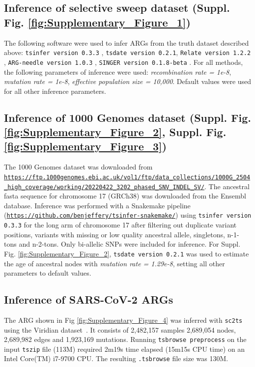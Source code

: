 \documentclass[unnumsec,webpdf,contemporary,large,namedate]{oup-authoring-template}%
\begin{document}
\subsection{Inference of selective sweep dataset (Suppl. Fig.
    \ref{fig:Supplementary_Figure_1})} The following software were used to infer
ARGs from the truth dataset described above: \texttt{tsinfer version 0.3.3}
\citep{kelleher2019inferring}, \texttt{tsdate version 0.2.1}, 
\texttt{Relate version 1.2.2} \citep{speidel2019method}, 
\texttt{ARG-needle version 1.0.3} \citep{zhang2023biobank},
\texttt{SINGER version 0.1.8-beta} \citep{deng2024robust}.
For all
methods, the following parameters of inference were used: \textit{recombination
    rate = 1e-8}, \textit{mutation rate = 1e-8}, \textit{effective population size
    = 10,000}. Default values were used for all other inference parameters.

\subsection{Inference of 1000 Genomes dataset (Suppl. Fig.
\ref{fig:Supplementary_Figure_2}, Suppl. Fig.
\ref{fig:Supplementary_Figure_3})} The 1000 Genomes dataset was downloaded from
\texttt{\url{https://ftp.1000genomes.ebi.ac.uk/vol1/ftp/data_collections/1000G_2504_high_coverage/working/20220422_3202_phased_SNV_INDEL_SV/}}.
The ancestral fasta sequence for chromosome 17 (GRCh38) was downloaded
from the Ensembl database. Inference was performed with a Snakemake pipeline
(\texttt{\url{https://github.com/benjeffery/tsinfer-snakemake/}}) using
\texttt{tsinfer version 0.3.3} for the long arm of chromosome 17 after
filtering out duplicate variant positions, variants with missing or low quality
ancestral allele, singletons, n-1-tons and n-2-tons. Only bi-allelic SNPs were
included for inference. For Suppl. Fig. \ref{fig:Supplementary_Figure_2}, 
\texttt{tsdate version 0.2.1} was used to estimate the age of ancestral nodes
 with \textit{mutation rate = 1.29e-8}, setting all other parameters to default 
 values. 

\subsection{Inference of SARS-CoV-2 ARGs}
The ARG shown in Fig \ref{fig:Supplementary_Figure_4} was inferred with
\texttt{sc2ts}~\citep{zhang2023biobank} using the Viridian
dataset~\citep{hunt2024addressing}. It consists of
2,482,157 samples
2,689,054 nodes,
2,689,982 edges
and
1,923,169 mutations.
Running \texttt{tsbrowse preprocess} on the input \texttt{tszip} file (113M)
required 2m19s time elapsed (15m15s CPU time) on an Intel Core(TM) i7-9700 CPU.
The resulting \texttt{.tsbrowse} file size was 130M.
\end{document}
